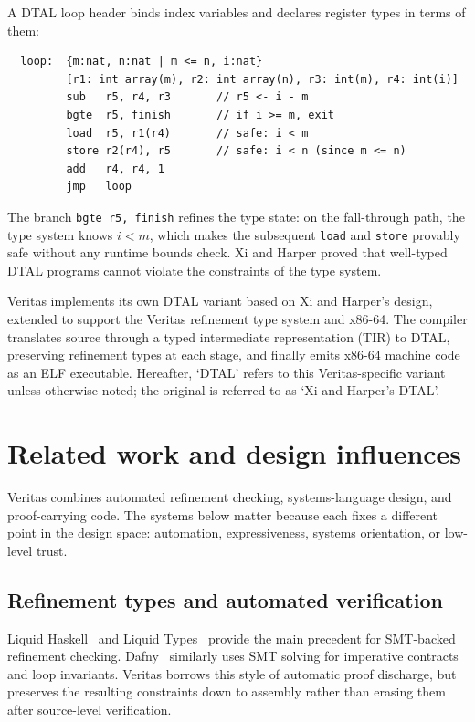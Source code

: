 \noindent A DTAL loop header binds index variables and declares register types in terms of them:

\begin{verbatim}
  loop:  {m:nat, n:nat | m <= n, i:nat}
         [r1: int array(m), r2: int array(n), r3: int(m), r4: int(i)]
         sub   r5, r4, r3       // r5 <- i - m
         bgte  r5, finish       // if i >= m, exit
         load  r5, r1(r4)       // safe: i < m
         store r2(r4), r5       // safe: i < n (since m <= n)
         add   r4, r4, 1
         jmp   loop
\end{verbatim}

\noindent The branch \texttt{bgte r5, finish} refines the type state: on the fall-through path, the type system knows $i < m$, which makes the subsequent \texttt{load} and \texttt{store} provably safe without any runtime bounds check. Xi and Harper proved that well-typed DTAL programs cannot violate the constraints of the type system.

Veritas implements its own DTAL variant based on Xi and Harper's design, extended to support the Veritas refinement type system and x86-64. The compiler translates source through a typed intermediate representation (TIR) to DTAL, preserving refinement types at each stage, and finally emits x86-64 machine code as an ELF executable. Hereafter, `DTAL' refers to this Veritas-specific variant unless otherwise noted; the original is referred to as `Xi and Harper's DTAL'.

\section{Related work and design influences}
\label{sec:related-work}

Veritas combines automated refinement checking, systems-language design, and proof-carrying code. The systems below matter because each fixes a different point in the design space: automation, expressiveness, systems orientation, or low-level trust.

\subsection{Refinement types and automated verification}
Liquid Haskell~\cite{Vazou2014Refinement} and Liquid Types~\cite{Rondon2008Liquid} provide the main precedent for SMT-backed refinement checking. Dafny~\cite{Leino2010Dafny} similarly uses SMT solving for imperative contracts and loop invariants. Veritas borrows this style of automatic proof discharge, but preserves the resulting constraints down to assembly rather than erasing them after source-level verification.

